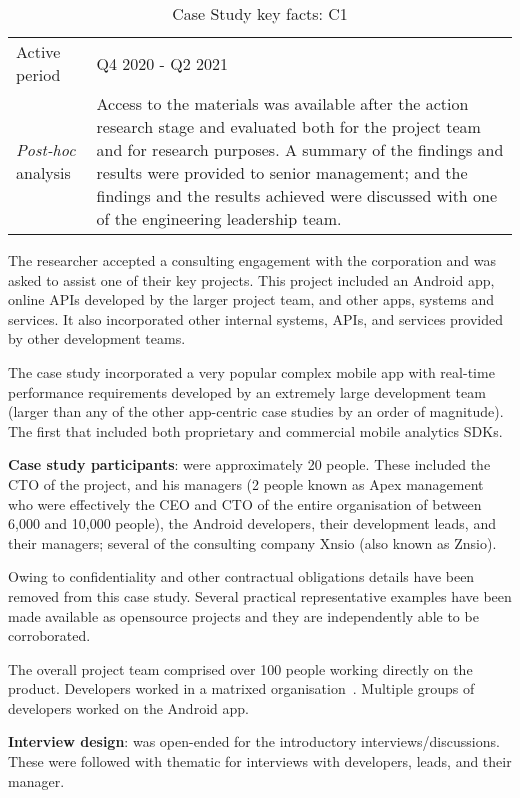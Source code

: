 \begin{table*}[h]
\begin{tabular}{lp{9cm}}
       Active period & Q4 2020 - Q2 2021 \\
       \arrayrulecolor{blue!20}\midrule
       \emph{Post-hoc} analysis & Access to the materials was available after the action research stage and evaluated both for the project team and for research purposes. A summary of the findings and results were provided to senior management; and the findings and the results achieved were discussed with one of the engineering leadership team. \\
       \bottomrule
    \end{tabular}
    \caption{Case Study key facts: C1}
    \label{tab:commercial_case_study_anaytics_overview}
\end{table*}

The researcher accepted a consulting engagement with the corporation and was asked to assist one of their key projects. This project included an Android app, online APIs developed by the larger project team, and other apps, systems and services. It also incorporated other internal systems, APIs, and services provided by other development teams. 

The case study incorporated a very popular complex mobile app with real-time performance requirements developed by an extremely large development team (larger than any of the other app-centric case studies by an order of magnitude). The first that included both proprietary and commercial mobile analytics SDKs.

\textbf{Case study participants}: were approximately 20 people. 
These included the CTO of the project, and his managers (2 people known as Apex management who were effectively the CEO and CTO of the entire organisation of between 6,000 and 10,000 people), the Android developers, their development leads, and their managers; several of the consulting company Xnsio (also known as Znsio).

Owing to confidentiality and other contractual obligations details have been removed from this case study. Several practical representative examples have been made available as opensource projects and they are independently able to be corroborated.

The overall project team comprised over 100 people working directly on the product. Developers worked in a matrixed organisation~. Multiple groups of developers worked on the Android app. 

\textbf{Interview design}:  
was open-ended for the introductory interviews/discussions. These were followed with thematic for interviews with developers, leads, and their manager.
    
